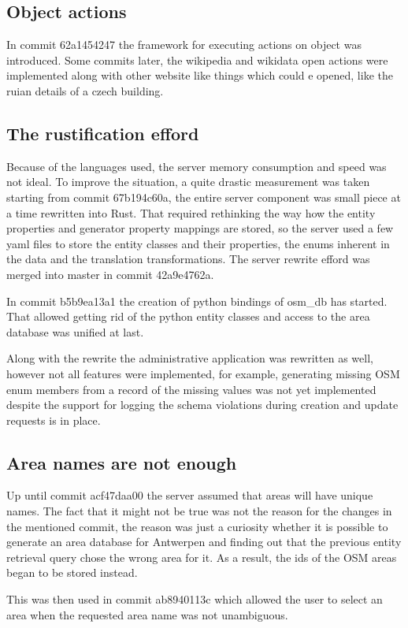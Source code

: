 \documentclass[nolof,digital]{fithesis3}
\begin{document}
\subsection{Object actions}
In commit 62a1454247 the framework for executing actions on object was introduced. Some commits later, the wikipedia and wikidata open actions were implemented along with other website like things which could e opened, like the ruian details of a czech building.
\subsection{The rustification efford}
Because of the languages used, the server memory consumption and speed was not ideal. To improve the situation, a quite drastic measurement was taken starting from commit 67b194c60a, the entire server component was small piece at a time rewritten into Rust. That required rethinking the way how the entity properties and generator property mappings are stored, so the server used a few yaml files to store the entity classes and their properties, the enums inherent in the data and the translation transformations. The server rewrite efford was merged into master in commit 42a9e4762a.

In commit b5b9ea13a1 the creation of python bindings of osm_db has started. That allowed getting rid of the python entity classes and access to the area database was unified at last.

Along with the rewrite the administrative application was rewritten as well, however not all features were implemented, for example, generating missing OSM enum members from a record of the missing values was not yet implemented despite the support for logging the schema violations during creation and update requests is in place.
\subsection{Area names are not enough}
Up until commit acf47daa00 the server assumed that areas will have unique names. The fact that it might not be true was not the reason for the changes in the mentioned commit, the reason was just a curiosity whether it is possible to generate an area database for Antwerpen and finding out that the previous entity retrieval query chose the wrong area for it. As a result, the ids of the OSM areas began to be stored instead.

This was then used in commit ab8940113c which allowed the user to select an area when the requested area name was not unambiguous.
\end{document}
